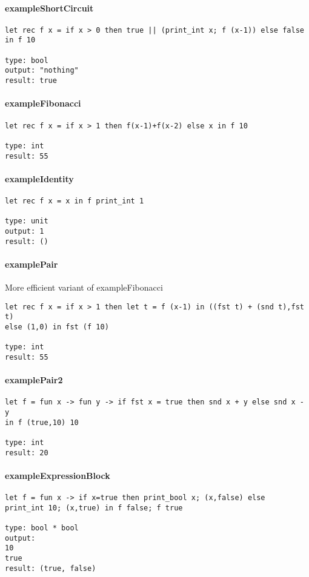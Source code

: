\documentclass[a4paper, 12pt, titlepage]{article}
\begin{document}
\paragraph{exampleShortCircuit}
\begin{verbatim}
let rec f x = if x > 0 then true || (print_int x; f (x-1)) else false in f 10

type: bool
output: "nothing"
result: true
\end{verbatim}

\paragraph{exampleFibonacci}
\begin{verbatim}
let rec f x = if x > 1 then f(x-1)+f(x-2) else x in f 10

type: int
result: 55
\end{verbatim}

\paragraph{exampleIdentity}
\begin{verbatim}
let rec f x = x in f print_int 1

type: unit
output: 1
result: ()
\end{verbatim}

\paragraph{examplePair} 
More efficient variant of exampleFibonacci
\begin{verbatim}
let rec f x = if x > 1 then let t = f (x-1) in ((fst t) + (snd t),fst t) 
else (1,0) in fst (f 10)

type: int
result: 55
\end{verbatim}

\paragraph{examplePair2}
\begin{verbatim}
let f = fun x -> fun y -> if fst x = true then snd x + y else snd x - y 
in f (true,10) 10

type: int
result: 20
\end{verbatim}

\paragraph{exampleExpressionBlock}
\begin{verbatim}
let f = fun x -> if x=true then print_bool x; (x,false) else 
print_int 10; (x,true) in f false; f true

type: bool * bool
output: 
10
true
result: (true, false)
\end{verbatim}
\end{document}
